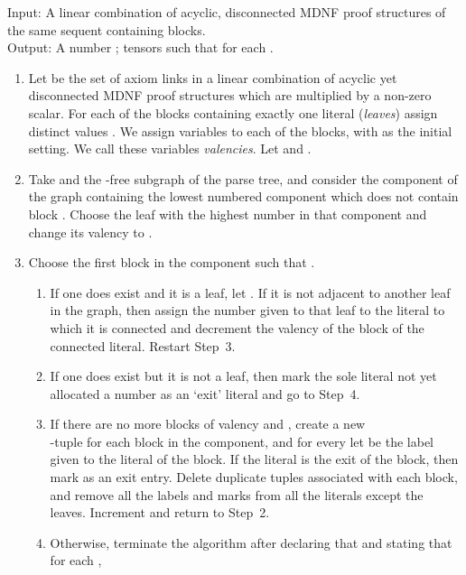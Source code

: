 \documentclass{LMCS}
\theoremstyle{plain}\newtheorem*{cLm}{Claim}
\newcommand{\hughf}[1]{#1}
\begin{document}
  \begin{algo} \label{DisconnectTupleAlg} Input: A linear combination of
    \hughf{acyclic, disconnected} MDNF proof structures of the same sequent
    containing  blocks. \\ Output: A number ; tensors
     such that  for each .
  \end{algo}
  \begin{enumerate}
  \item Let  be the set of axiom
    links in a linear combination of acyclic yet disconnected MDNF
    proof structures which are multiplied by a non-zero scalar. For
    each of the blocks containing exactly one literal (\emph{leaves})
    assign distinct values . We assign variables
     to each of the  blocks, with  as the initial setting. We call these variables
    \emph{valencies}. Let  and .
  
  \item Take  and the -free subgraph of the parse
    tree, and consider the component of the graph containing the lowest
    numbered component which does not contain block . Choose the
    leaf with the highest number in that component and change its
    valency to .
  
  \item Choose the first block  in the component such that .
    \begin{enumerate}
    \item If one does exist and it is a leaf, let . If it is
      not adjacent to another leaf in the graph, then assign the number
      given to that leaf to the literal to which it is connected and decrement the valency of the block of the connected literal.
      Restart Step~3.
    \item If one does exist but it is not a leaf, then mark the sole
      literal not yet allocated a number as an `exit' literal and go to
      Step~4.
    \item If there are no more blocks of valency  and , create
      a new \\ -tuple  for each block  in the
      component, and for every  let  be the label given to the  literal of the
      block. If the  literal is the exit of the block, then
      mark  as an exit entry. Delete duplicate tuples associated
      with each block, and remove all the labels and marks from all the
      literals except the leaves. Increment  and return to Step~2.
    \item Otherwise, terminate the algorithm after declaring that  and stating that for each ,
      

\end{enumerate}
\end{enumerate}
\end{document}
